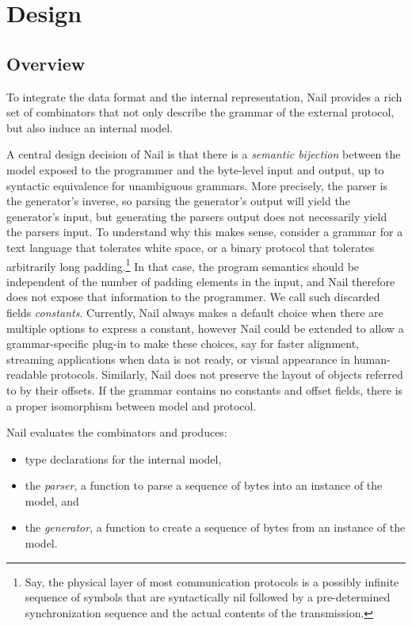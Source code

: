 \section{Design}
\label{s:design}

\subsection{Overview}

To integrate the data format and the internal representation, Nail
provides a rich set of combinators that not
only describe the grammar of the external protocol, but also induce an internal
model.

A central design decision of Nail is that there is a \emph{semantic bijection} between
the model exposed to the programmer and the byte-level input and output, up to
syntactic equivalence for unambiguous grammars. More precisely, the parser is
the generator's inverse, so parsing the generator's output will yield the
generator's input, but generating the parsers output does not necessarily yield
the parsers input. To understand why this makes sense, consider a grammar for a
text language that tolerates white space, or a binary protocol that tolerates
arbitrarily long padding.\footnote{Say, the physical layer of most communication
  protocols is a possibly infinite sequence of symbols that are syntactically
  nil followed by a pre-determined synchronization sequence and the actual
  contents of the transmission.} In that case, the program semantics should be
independent of the number of padding elements in the input, and Nail therefore
does not expose that information to the programmer. We call such discarded
fields \emph{constants}. Currently, Nail always makes a default choice when
there are multiple options to express a constant, however Nail could be extended
to allow a grammar-specific plug-in to make these choices, say for faster
alignment, streaming applications when data is not ready, or visual appearance in
human-readable protocols. Similarly, Nail does not preserve the layout of
objects referred to by their offsets. If the grammar contains no constants and
offset fields, there is a proper isomorphism between model and protocol.


Nail evaluates the combinators and produces:

\begin{itemize}
\item type declarations for the internal model,
\item the \textit{parser}, a function to parse a sequence of bytes into an
instance of the model, and
\item the \textit{generator}, a function to create a
sequence of bytes from an instance of the model.
\end{itemize}

